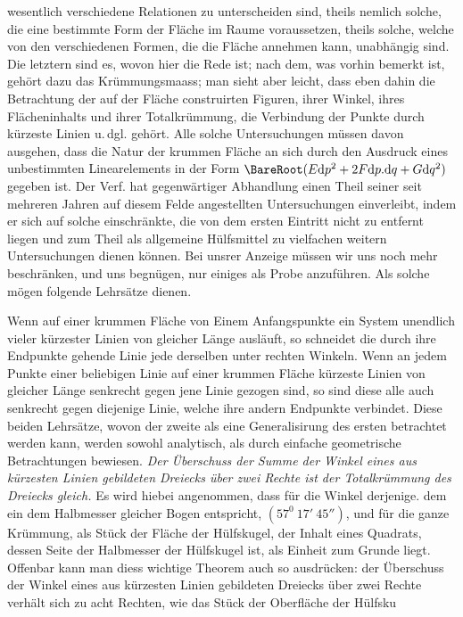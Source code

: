 %
wesentlich verschiedene Relationen zu unterscheiden sind, theils nemlich solche, die eine bestimmte Form der Fläche im Raume voraussetzen, theils solche, welche von den verschiedenen Formen, die die Fläche annehmen kann, unabhängig sind. Die letztern sind es, wovon hier die Rede ist; nach dem, was vorhin bemerkt ist, gehört dazu das Krümmungsmaass; man sieht aber leicht, dass eben dahin die Betrachtung der auf der Fläche construirten Figuren, ihrer Winkel, ihres Flächeninhalts und ihrer Totalkrümmung, die Verbindung der Punkte durch kürzeste Linien u.\,dgl. gehört. Alle solche Untersuchungen müssen davon ausgehen, dass die Natur der krummen Fläche an sich durch den Ausdruck eines unbestimmten Linearelements in der Form \(\BareRoot(E\mathrm{d}p^2+2F\mathrm{d}p\mathord{.}\mathrm{d}q+G\mathrm{d}q^2)\) gegeben ist. Der Verf. hat gegenwärtiger Abhandlung einen Theil seiner seit mehreren Jahren auf diesem Felde angestellten Untersuchungen einverleibt, indem er sich auf solche einschränkte, die von dem ersten Eintritt nicht zu entfernt liegen und zum Theil als allgemeine Hülfsmittel zu vielfachen weitern Untersuchungen dienen können. Bei unsrer Anzeige müssen wir uns noch mehr beschränken, und uns begnügen, nur einiges als Probe anzuführen. Als solche mögen folgende Lehrsätze dienen.

Wenn auf einer krummen Fläche von Einem Anfangspunkte ein System unendlich vieler kürzester Linien von gleicher Länge ausläuft, so schneidet die durch ihre Endpunkte gehende Linie jede derselben unter rechten Winkeln. Wenn an jedem Punkte einer beliebigen Linie auf einer krummen Fläche kürzeste Linien von gleicher Länge senkrecht gegen jene Linie gezogen sind, so sind diese alle auch senkrecht gegen diejenige Linie, welche ihre andern Endpunkte verbindet. Diese beiden Lehrsätze, wovon der zweite als eine Generalisirung des ersten betrachtet werden kann, werden sowohl analytisch, als durch einfache geometrische Betrachtungen bewiesen. \textit{Der Überschuss der Summe der Winkel eines aus kürzesten Linien gebildeten Dreiecks über zwei Rechte ist der Totalkrümmung des Dreiecks gleich.} Es wird hiebei angenommen, dass für die Winkel derjenige. dem ein dem Halbmesser gleicher Bogen entspricht, \((57^0\ 17'\ 45'')\), und für die ganze Krümmung, als Stück der Fläche der Hülfskugel, der Inhalt eines Quadrats, dessen Seite der Halbmesser der Hülfskugel ist, als Einheit zum Grunde liegt. Offenbar kann man diess wichtige Theorem auch so ausdrücken: der Überschuss der Winkel eines aus kürzesten Linien gebildeten Dreiecks über zwei Rechte verhält sich zu acht Rechten, wie das Stück der Oberfläche der Hülfsku%
